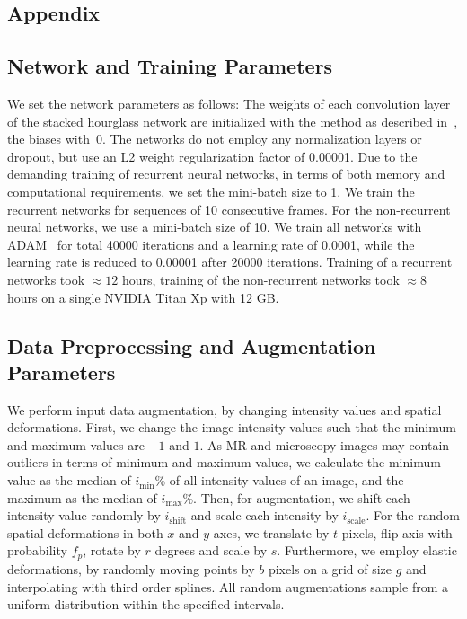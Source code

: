 \documentclass[runningheads,a4paper]{llncs}
\begin{document}
\begin{appendices}
\renewcommand{\thesection}{\arabic{section}}%


\chapter*{Appendix}

\section{Network and Training Parameters}
We set the network parameters as follows:
The weights of each convolution layer of the stacked hourglass network are initialized with the method as described in~\cite{He2015}, the biases with~0.
The networks do not employ any normalization layers or dropout, but use an L2 weight regularization factor of 0.00001.
Due to the demanding training of recurrent neural networks, in terms of both memory and computational requirements, we set the mini-batch size to 1.
We train the recurrent networks for sequences of 10 consecutive frames.
For the non-recurrent neural networks, we use a mini-batch size of 10.
We train all networks with ADAM~\cite{Kingma2015} for total 40000 iterations and a learning rate of 0.0001, while the learning rate is reduced to 0.00001 after 20000 iterations.
Training of a recurrent networks took $\approx12$ hours, training of the non-recurrent networks took $\approx8$ hours on a single NVIDIA Titan Xp with 12 GB.

\section{Data Preprocessing and Augmentation Parameters}

We perform input data augmentation, by changing intensity values and spatial deformations.
First, we change the image intensity values such that the minimum and maximum values are $-1$ and $1$.
As MR and microscopy images may contain outliers in terms of minimum and maximum values, we calculate the minimum value as the median of $i_{\text{min}}$\% of all intensity values of an image, and the maximum as the median of $i_{\text{max}}$\%.
Then, for augmentation, we shift each intensity value randomly by $i_{\text{shift}}$ and scale each intensity by $i_{\text{scale}}$.
For the random spatial deformations in both $x$ and $y$ axes, we translate by $t$ pixels, flip axis with probability $f_p$, rotate by $r$ degrees and scale by $s$.
Furthermore, we employ elastic deformations, by randomly moving points by $b$ pixels on a grid of size $g$ and interpolating with third order splines.
All random augmentations sample from a uniform distribution within the specified intervals.


\end{appendices}
\end{document}
